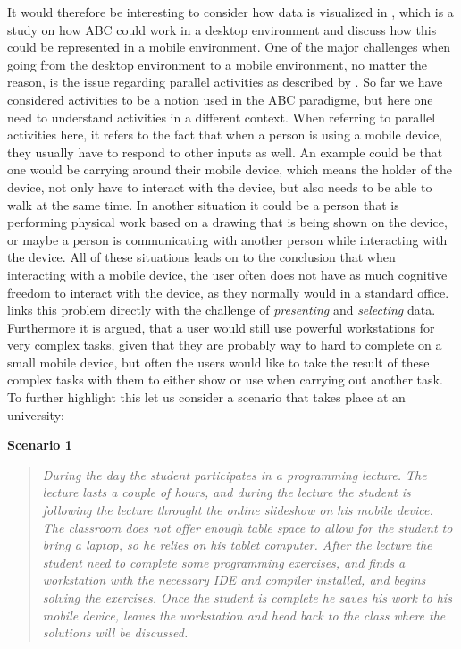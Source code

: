 It would therefore be interesting to consider how data is visualized in \citet{bardram2006}, which is a study on how ABC could work in a desktop environment and discuss how this could be represented in a mobile environment. One of the major challenges when going from the desktop environment to a mobile environment, no matter the reason, is the issue regarding parallel activities as described by \citet{chittaro}. So far we have considered activities to be a notion used in the ABC paradigme, but here one need to understand activities in a different context. When referring to parallel activities here, it refers to the fact that when a person is using a mobile device, they usually have to respond to other inputs as well. An example could be that one would be carrying around their mobile device, which means the holder of the device, not only have to interact with the device, but also needs to be able to walk at the same time. In another situation it could be a person that is performing physical work based on a drawing that is being shown on the device, or maybe a person is communicating with another person while interacting with the device. All of these situations leads on to the conclusion that when interacting with a mobile device, the user often does not have as much cognitive freedom to interact with the device, as they normally would in a standard office. \citet{chittaro} links this problem directly with the challenge of \emph{presenting} and \emph{selecting} data. Furthermore it is argued, that a user would still use powerful workstations for very complex tasks, given that they are probably way to hard to complete on a small mobile device, but often the users would like to take the result of these complex tasks with them to either show or use when carrying out another task. To further highlight this let us consider a scenario that takes place at an university:
\par\vspace{\baselineskip}

\textbf{Scenario 1}
\begin{quotation}
\emph{
	During the day the student participates in a programming lecture. The lecture lasts a couple of hours, and during the lecture the student is following the lecture throught the online slideshow on his mobile device. The classroom does not offer enough table space to allow for the student to bring a laptop, so he relies on his tablet computer. After the lecture the student need to complete some programming exercises, and finds a workstation with the necessary IDE and compiler installed, and begins solving the exercises. Once the student is complete he saves his work to his mobile device, leaves the workstation and head back to the class where the solutions will be discussed.
	}
\end{quotation}

